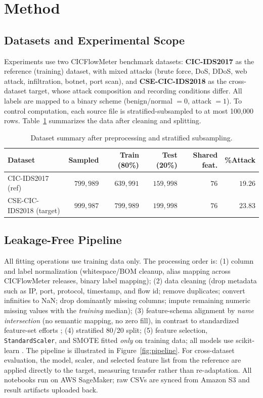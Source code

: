 \documentclass[11pt,a4paper]{article}
\begin{document}
\section{Method}
\subsection{Datasets and Experimental Scope}
Experiments use two CICFlowMeter benchmark datasets: \textbf{CIC-IDS2017} as the reference
(training) dataset, with mixed attacks (brute force, DoS, DDoS, web attack, infiltration,
botnet, port scan), and \textbf{CSE-CIC-IDS2018} as the cross-dataset target, whose attack
composition and recording conditions differ. All labels are mapped to a binary scheme
(benign/normal $=0$, attack $=1$). To control computation, each source file is
stratified-subsampled to at most 100{,}000 rows. Table~\ref{tab:data} summarizes the data
after cleaning and splitting.

\begin{table}[htbp]
\centering
\caption{Dataset summary after preprocessing and stratified subsampling.}
\label{tab:data}
\footnotesize
\begin{tabular}{lrrrrr}
\toprule
Dataset & Sampled & Train (80\%) & Test (20\%) & Shared feat. & \%Attack \\
\midrule
CIC-IDS2017 (ref)       & $799{,}989$ & $639{,}991$ & $159{,}998$ & $76$ & $19.26$ \\
CSE-CIC-IDS2018 (target)& $999{,}987$ & $799{,}989$ & $199{,}998$ & $76$ & $23.83$ \\
\bottomrule
\end{tabular}
\end{table}

\subsection{Leakage-Free Pipeline}
All fitting operations use training data only. The processing order is: (1) column and
label normalization (whitespace/BOM cleanup, alias mapping across CICFlowMeter releases,
binary label mapping); (2) data cleaning (drop metadata such as IP, port, protocol,
timestamp, and flow id; remove duplicates; convert infinities to NaN; drop dominantly
missing columns; impute remaining numeric missing values with the \emph{training} median);
(3) feature-schema alignment by \emph{name intersection} (no semantic mapping, no zero
fill), in contrast to standardized feature-set efforts \cite{sarhan}; (4) stratified 80/20 split; (5) feature selection, \texttt{StandardScaler}, and
SMOTE \cite{chawla} fitted \emph{only} on training data; all models use scikit-learn
\cite{pedregosa}. The pipeline is illustrated in
Figure~\ref{fig:pipeline}. For cross-dataset evaluation, the model, scaler, and selected
feature list from the reference are applied directly to the target, measuring transfer
rather than re-adaptation. All notebooks run on AWS SageMaker; raw CSVs are synced from
Amazon S3 and result artifacts uploaded back.
\end{document}

